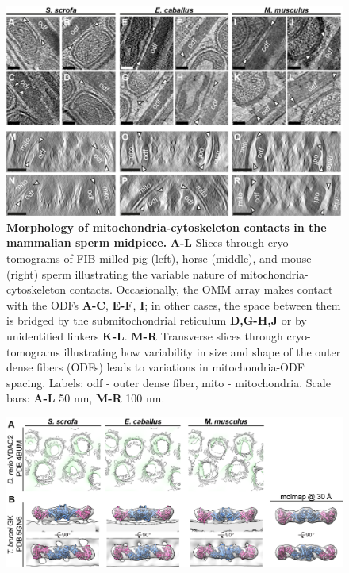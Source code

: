 \begin{subappendices}
\begin{figure}[hbt]
		\label{fig:ch4_app_fig3}
	\end{figure}
	\begin{figure}[hbt]
		\center
		\includegraphics[]{Chapter.4/Figures/SI_Figure4.png}
		\caption{\textbf{Morphology of mitochondria-cytoskeleton contacts in the mammalian sperm midpiece.} \textbf{A-L} Slices through cryo-tomograms of FIB-milled pig (left), horse (middle), and mouse (right) sperm illustrating the variable nature of mitochondria-cytoskeleton contacts. Occasionally, the OMM array makes contact with the ODFs \textbf{A-C}, \textbf{E-F}, \textbf{I}; in other cases, the space between them is bridged by the submitochondrial reticulum \textbf{D,G-H,J} or by unidentified linkers \textbf{K-L}. \textbf{M-R} Transverse slices through cryo-tomograms illustrating how variability in size and shape of the outer dense fibers (ODFs) leads to variations in mitochondria-ODF spacing. Labels: odf - outer dense fiber, mito - mitochondria. Scale bars: \textbf{A-L} 50 nm, \textbf{M-R} 100 nm.}
		\label{fig:ch4_app_fig4}
	\end{figure}
	\begin{figure}[hbt]
		\center
		\includegraphics[]{Chapter.4/Figures/SI_Figure5.png}

\end{figure}
\end{subappendices}
